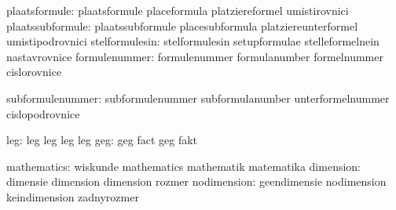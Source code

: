                 plaatsformule:  plaatsformule                placeformula
                                platziereformel              umistirovnici
             plaatssubformule:  plaatssubformule             placesubformula
                                platziereunterformel         umistipodrovnici
               stelformulesin:  stelformulesin               setupformulae
                                stelleformelnein             nastavrovnice
                formulenummer:  formulenummer                formulanumber
                                formelnummer                 cislorovnice

             subformulenummer:  subformulenummer             subformulanumber
                                unterformelnummer            cislopodrovnice

                           leg: leg                          leg
                                leg                          leg
                           geg: geg                          fact
                                geg                          fakt

                  mathematics:  wiskunde                     mathematics
                                mathematik                   matematika
                    dimension:  dimensie                     dimension
                                dimension                    rozmer
                  nodimension:  geendimensie                 nodimension
                                keindimension                zadnyrozmer

